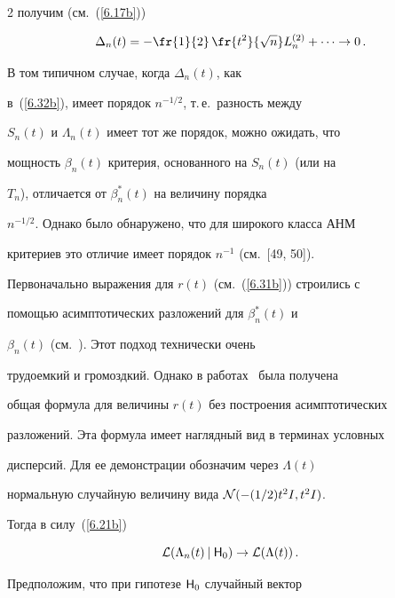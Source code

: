 \begin{multicols}{2}
получим (см.~(\ref{6.17b}))


\begin{equation}


\Delta_n(t) = -\fr{1}{2}\,\fr{t^2}{\sqrt{n}}L_n^{(2)}+\cdots \to


0\,.


\label{6.33b}


\end{equation}


В том типичном случае, когда $\Delta_n(t)$, как


в~(\ref{6.32b}), имеет порядок $n^{-1/2}$, т.\,е.\ разность между


$S_n(t)$ и $\Lambda_n(t)$ имеет тот же порядок, можно ожидать, что


мощность $\beta_n(t)$ критерия, основанного на $S_n(t)$ (или на


$T_n$), отличается от $\beta_n^*(t)$ на величину порядка


$n^{-1/2}$. Однако было обнаружено, что для широкого класса АНМ


критериев это отличие имеет порядок $n^{-1}$ (см.~[49, 50]).


Первоначально выражения для $r(t)$ (см.~(\ref{6.31b})) строились с


помощью асимптотических разложений для $\beta_n^*(t)$ и


$\beta_n(t)$ (см.~\cite{26be, 51be}). Этот подход технически очень


трудоемкий и громоздкий. Однако в работах~\cite{19be, 25be} была получена


общая формула для величины $r(t)$ без построения асимптотических


разложений. Эта формула имеет наглядный вид в терминах условных


дисперсий. Для ее демонстрации обозначим через $\Lambda(t)$


нормальную случайную величину вида ${\cal N}(-(1/2)t^2I,t^2I)$.


Тогда в силу~(\ref{6.21b})


\begin{equation*}


{\cal L}(\Lambda_n(t)\:|\:{\sf H}_0)\to{\cal L}(\Lambda(t))\,.




\end{equation*}


Предположим, что при гипотезе ${\sf H}_0$ случайный вектор





\end{multicols}
